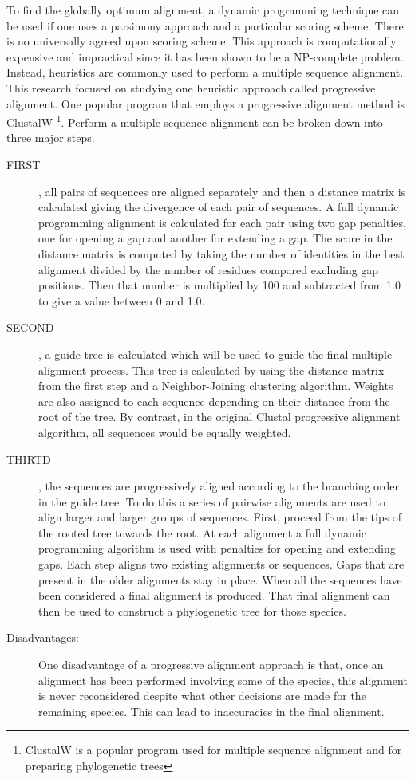 To find the globally optimum alignment, a dynamic programming technique 
can be used if one uses a parsimony approach and a particular scoring scheme. 
There is no universally agreed upon scoring scheme. This approach is 
computationally expensive and impractical since it has been shown to be a NP-complete 
problem. Instead, heuristics are commonly used to perform a multiple 
sequence alignment. This research focused on studying one heuristic approach 
called progressive alignment. One popular program that employs a progressive 
alignment method is ClustalW \nocite{clustalw} \footnote{ClustalW is a popular 
program used for multiple sequence alignment and for preparing phylogenetic trees}. 
Perform a multiple sequence alignment can be broken down into three major steps.
\nocite{clustalwsite}

\begin{description}
\item[FIRST], all pairs of sequences are aligned separately and then a distance 
matrix is calculated giving the divergence of each pair of sequences. A full 
dynamic programming alignment is calculated for each pair using two gap 
penalties, one for opening a gap and another for extending a gap. The score in the 
distance matrix is computed by taking the number of identities in the best 
alignment divided by the number of residues compared excluding gap positions. 
Then that number is multiplied by 100 and subtracted from 1.0 to give a value 
between 0 and 1.0.
\item[SECOND], a guide tree is calculated which will be used to guide the final 
multiple alignment process. This tree is calculated by using the distance matrix 
from the first step and a Neighbor-Joining clustering algorithm. Weights are also 
assigned to each sequence depending on their distance from the root of the tree. By 
contrast, in the original Clustal progressive alignment algorithm, all sequences 
would be equally weighted. 
\item[THIRTD], the sequences are progressively aligned according to the branching 
order in the guide tree. To do this a series of pairwise alignments are used to align 
larger and larger groups of sequences. First, proceed from the tips of the rooted 
tree towards the root. At each alignment a full dynamic programming algorithm is 
used with penalties for opening and extending gaps. Each step aligns two existing 
alignments or sequences. Gaps that are present in the older alignments stay in 
place. When all the sequences have been considered a final alignment is produced. 
That final alignment can then be used to construct a phylogenetic tree for those 
species. 
\item[Disadvantages:] One disadvantage of a progressive alignment approach is that, once an 
alignment has been performed involving some of the species, this alignment is 
never reconsidered despite what other decisions are made for the remaining species. 
This can lead to inaccuracies in the final alignment.
\end{description}

